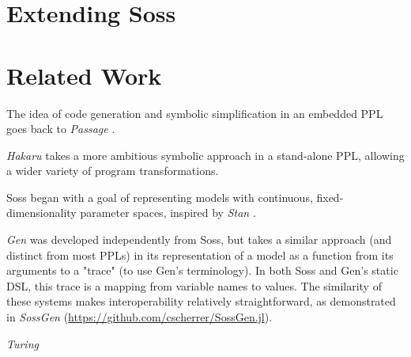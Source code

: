 \documentclass[anonymous=false, %
               format=acmsmall, %
               review=true, %
               screen=true, %
               nonacm=true]{acmart}
\begin{document}

  
  
  



\section{Extending Soss}

\section{Related Work}

The idea of code generation and symbolic simplification in an embedded PPL goes back to \emph{Passage} \cite{Scherrer2012}. 

\emph{Hakaru} \cite{narayanan2016probabilistic} takes a more ambitious symbolic approach in a stand-alone PPL, allowing a wider variety of program transformations. 

Soss began with a goal of representing models with continuous, fixed-dimensionality parameter spaces, inspired by \emph{Stan} \cite{stan:2017}.

\emph{Gen} \cite{Cusumano-Towner:2019} was developed independently from Soss, but takes a similar approach (and distinct from most PPLs) in its representation of a model as a function from its arguments to a "trace" (to use Gen's terminology). In both Soss and Gen's static DSL, this trace is a mapping from variable names to values. The similarity of these systems makes interoperability relatively straightforward, as demonstrated in \emph{SossGen} (\url{https://github.com/cscherrer/SossGen.jl}).

\emph{Turing} \cite{ge2018t}
\end{document}
